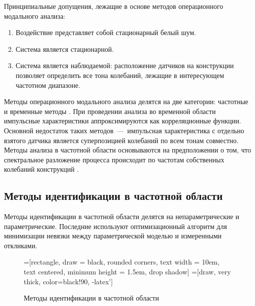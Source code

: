 Принципиальные допущения, лежащие в основе методов операционного модального анализа:
\begin{enumerate}[noitemsep]
	\item Воздействие представляет собой стационарный белый шум.
	\item Система является стационарной.
	\item Система является наблюдаемой: расположение датчиков на конструкции позволяет определить все тона колебаний, лежащие в интересующем частотном диапазоне. 
\end{enumerate}

Методы операционного модального анализа делятся на две категории: частотные и временные методы \cite{lib:oma:Magalhaes}. При проведении анализа во временной области импульсные характеристики аппроксимируются как корреляционные функции. Основной недостаток таких методов~---~импульсная характеристика с отдельно взятого датчика является суперпозицией колебаний по всем тонам совместно. Методы анализа в частотной области основываются на предположении о том, что спектральное разложение процесса происходит по частотам собственных колебаний конструкций \cite{lib:oma:Brincker}. 

\subsection{Методы идентификации в частотной области}

Методы идентификации в частотной области  делятся на непараметрические и параметрические. Последние используют оптимизационный алгоритм для минимизации невязки между параметрической моделью и измеренными откликами. 

\begin{figure}[H]
	\centering
	=[rectangle, draw = black, rounded corners, text width = 10em, text centered, minimum height = 1.5em, drop shadow]
	=[draw, very thick, color=black!90, -latex']
	\caption{Методы идентификации в частотной области} \label{fig:schemeFrequencyDomainOMA}
\end{figure}

